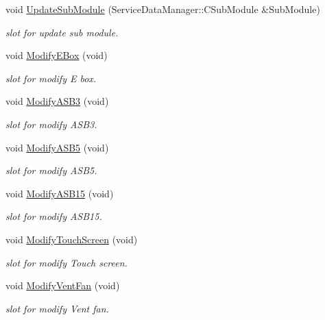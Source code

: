 \begin{DoxyCompactItemize}
\item 
void \hyperlink{classSystemTracking_1_1CMainControl_a49a9bf2719340b4d072118f4f6925c33}{\-Update\-Sub\-Module} (\-Service\-Data\-Manager\-::\-C\-Sub\-Module \&\-Sub\-Module)
\begin{DoxyCompactList}\small\item\em slot for update sub module. \end{DoxyCompactList}\item 
void \hyperlink{classSystemTracking_1_1CMainControl_a424c87c626dd641ff3df7fc3c9aa6a4e}{\-Modify\-E\-Box} (void)
\begin{DoxyCompactList}\small\item\em slot for modify \-E box. \end{DoxyCompactList}\item 
void \hyperlink{classSystemTracking_1_1CMainControl_a4af4a3c0a79d59b6fc3edb7952928a1f}{\-Modify\-A\-S\-B3} (void)
\begin{DoxyCompactList}\small\item\em slot for modify \-A\-S\-B3. \end{DoxyCompactList}\item 
void \hyperlink{classSystemTracking_1_1CMainControl_ade32f77c4473db0eef5998fe1ab83fe9}{\-Modify\-A\-S\-B5} (void)
\begin{DoxyCompactList}\small\item\em slot for modify \-A\-S\-B5. \end{DoxyCompactList}\item 
void \hyperlink{classSystemTracking_1_1CMainControl_abed872e022218b735429921ff01e975e}{\-Modify\-A\-S\-B15} (void)
\begin{DoxyCompactList}\small\item\em slot for modify \-A\-S\-B15. \end{DoxyCompactList}\item 
void \hyperlink{classSystemTracking_1_1CMainControl_aee506e100f3fff5b3a83b2090de9b859}{\-Modify\-Touch\-Screen} (void)
\begin{DoxyCompactList}\small\item\em slot for modify \-Touch screen. \end{DoxyCompactList}\item 
void \hyperlink{classSystemTracking_1_1CMainControl_ac56412bf8e60d469b8b32b563c33d437}{\-Modify\-Vent\-Fan} (void)
\begin{DoxyCompactList}\small\item\em slot for modify \-Vent fan. \end{DoxyCompactList}\item 

\end{DoxyCompactItemize}
